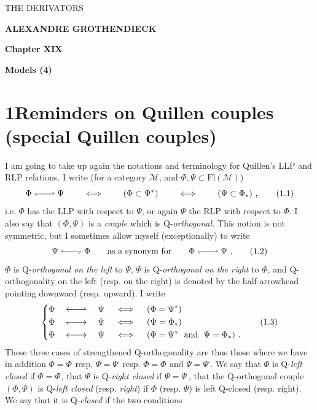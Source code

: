 \documentclass[11pt]{article}
\newcommand{\printedpage}[1]{\marginpar{\footnotesize p.~#1}}
\newcommand{\msp}[1]{\marginpar{\footnotesize [#1]}}
\newcommand{\Qo}{\mathrel{\leftharpoondown\joinrel\relbar\joinrel\rightharpoonup}}   %
\newcommand{\Qorev}{\mathrel{\leftharpoonup\joinrel\relbar\joinrel\rightharpoondown}} %
\newcommand{\Qog}{\mathrel{\leftarrow\joinrel\relbar\joinrel\rightharpoonup}}         %
\newcommand{\Qod}{\mathrel{\leftharpoondown\joinrel\relbar\joinrel\rightarrow}}       %
\newcommand{\Qogd}{\mathrel{\leftarrow\joinrel\relbar\joinrel\rightarrow}}            %
\newcommand{\tld}{\tilde{}}   %
\newcommand{\rcl}{\bar{}}       %
\begin{document}
\printedpage{(unnumbered)}

\begin{center}
{\Large\textsf{THE DERIVATORS}}

\bigskip

\textbf{ALEXANDRE GROTHENDIECK}

\bigskip\bigskip

\textbf{Chapter XIX}

\medskip

\textbf{Models (4)}
\end{center}

\newpage


\printedpage{1}

\msp{page 1}

\section*{1\quad Reminders on Quillen couples (special Quillen couples)}

I am going to take up again the notations and terminology for Quillen's LLP and RLP relations. I write (for a category $\mathcal{M}$, and $\Phi, \Psi \subset \mathrm{Fl}(\mathcal{M})$)
\[
\Phi \Qo \Psi \qquad \iff \qquad (\Phi \subset \Psi^{*}) \qquad \iff \qquad (\Psi \subset \Phi_{*})\ ,
\tag*{(1.1)}
\]
i.e. $\Phi$ has the LLP with respect to $\Psi$, or again $\Psi$ the RLP with respect to $\Phi$. I also say that $(\Phi, \Psi)$ is a \textit{couple} which is Q-\textit{orthogonal.} This notion is not symmetric, but I sometimes allow myself (exceptionally) to write
\[
\Psi \Qorev \Phi \qquad \text{as a synonym for} \qquad \Phi \Qo \Psi\ .
\tag*{(1.2)}
\]
$\Phi$ is Q-\textit{orthogonal on the left} to $\Psi$, $\Psi$ is Q-\textit{orthogonal on the right} to $\Phi$, and Q-orthogonality on the left (resp. on the right) is denoted by the half-arrowhead pointing downward (resp. upward). I write
\[
\left\{
\begin{aligned}
&\Phi \quad \Qog \quad \Psi \quad \iff \quad (\Phi = \Psi^{*})\\
&\Phi \quad \Qod \quad \Psi \quad \iff \quad (\Psi = \Phi_{*})\\
&\Phi \quad \Qogd \quad \Psi \quad \iff \quad (\Phi = \Psi^{*} \ \text{ and } \ \Psi = \Phi_{*})\ .
\end{aligned}
\right.
\tag*{(1.3)}
\]
These three cases of strengthened Q-orthogonality are thus those where we have in addition $\Phi = \Phi^{\tld}$
resp. $\Psi = \Psi^{\rcl}$ resp. $\Phi = \Phi^{\tld}$ and $\Psi = \Psi^{\rcl}$. We say that $\Phi$ is Q-\textit{left closed} if $\Phi = \Phi^{\tld}$, that %
$\Psi$ is Q-\textit{right closed} if $\Psi = \Psi^{\rcl}$, that the Q-orthogonal couple $(\Phi, \Psi)$ is Q-\textit{left closed} (resp. \textit{right}) if $\Phi$ (resp. $\Psi$) is left Q-closed (resp. right). We say that it is Q-\textit{closed} if the two conditions %
\end{document}
